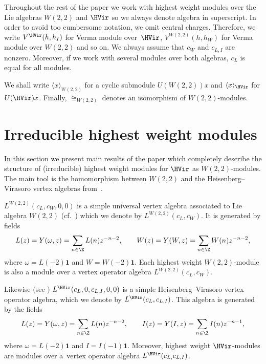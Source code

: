 \begin{Remark}
Throughout the rest of the paper we work with highest weight modules over the Lie algebras $W(2,2)$ and $\HVir$ so we always denote algebra in superscript. In order to avoid too cumbersome notation, we omit central charges. Therefore, we write $V^{\HVir}(h,h_{I}) $ for Verma module over~$\HVir$, ${V}^{W(2,2)}(h,h_{W}) $ for Verma module over $W(2,2)$ and so on. We always assume that $c_{W}$ and $c_{L,I}$ are nonzero. Moreover, if we work with several modules over both algebras, $c_{L}$ is equal for all modules.

We shall write $\langle x \rangle_{W(2,2)}$ for a cyclic submodule $U (W(2,2))x$ and $\langle x \rangle_{\HVir}$ for $U(\HVir)x$. Finally, $\cong_{W(2,2)}$ denotes an isomorphism of $W(2,2)$-modules.
\end{Remark}

\section{Irreducible highest weight modules}\label{result}
In this section we present main results of the paper which completely describe the structure of (irreducible) highest weight modules for $\HVir$ as $W(2,2)$-modules. The main tool is the homomorphism between $W(2,2)$ and the Heisenberg--Virasoro vertex algebras from~\cite{nas}.

$L^{W(2,2) }( c_{L},c_{W},0,0) $ is a simple universal vertex algebra associated to Lie algebra $W(2,2)$ (cf.\ \cite{R-JMP, Zhang-Dong}) which we denote by $L^{W(2,2)}(c_{L},c_{W})$. It is generated by f\/ields
\begin{gather*}
L(z)=Y(\omega ,z)=\sum_{n\in {\Z}}L(n)z^{-n-2},\qquad W(z)=Y(W,z)=\sum_{n\in {\Z}}W(n)z^{-n-2},
\end{gather*}
where $\omega =L(-2)\mathbf{1}$ and $W=W(-2)\mathbf{1}$. Each highest weight $W(2,2) $-module is also a module over a vertex operator algebra $L^{W(2,2) }(c_{L},c_{W})$.

Likewise (see \cite{Billig3}) $L^{\HVir}(c_{L},0,c_{L,I},0,0) $ is a simple Heisenberg--Virasoro vertex operator algebra, which we denote by $L^{\HVir}(c_{L},c_{L,I}) $. This algebra is generated by the f\/ields
\begin{gather*}
L(z)=Y(\omega ,z)=\sum_{n\in {\Z}}L(n)z^{-n-2},\qquad I(z)=Y(I,z)=\sum_{n\in {\Z}}I(n)z^{-n-1},
\end{gather*}
where $\omega =L(-2)\mathbf{1}$ and $I=I(-1)\mathbf{1}$. Moreover, highest weight $\HVir$-modules are modules over a~vertex operator algebra
$L^{\HVir}(c_{L,}c_{L,I})$.

